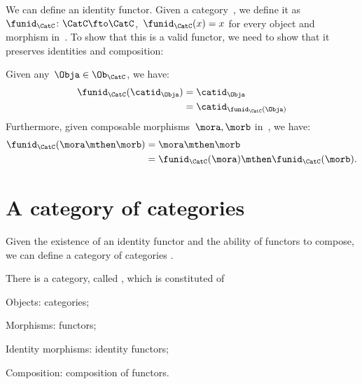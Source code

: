 We can define an identity functor. Given a category~\CatC, we define it as~$\funid_\CatC\colon \CatC \fto \CatC$,~$\funid_\CatC(x)=x$ for every object and morphism in~\CatC. To show that this is a valid functor, we need to show that it preserves identities and composition:
\begin{compactitem}
  \item Given any~$\Obja \in \Ob_\CatC$, we have:
  \begin{equation*}
    \begin{aligned}
      \funid_{\CatC}(\catid_\Obja)&=\catid_\Obja\\
      &=\catid_{\funid_{\CatC}(\Obja)}
    \end{aligned}
  \end{equation*}
  Furthermore, given composable morphisms~$\mora,\morb$ in~\CatC, we have:
  \begin{equation*}
    \begin{aligned}
      \funid_{\CatC}(\mora\mthen\morb)&=\mora\mthen\morb\\
      &=\funid_{\CatC}(\mora)\mthen \funid_{\CatC} (\morb).
    \end{aligned}
  \end{equation*}
\end{compactitem}


\section{A category of categories}

Given the existence of an identity functor and the ability of functors to compose, we can define a category of categories \Category.

\begin{ctdefinition}
  \label{def:Category}
  There is a category, called \Category, which is constituted of
  \begin{compactitem}
    \item Objects: categories;
    \item Morphisms: functors;
    \item Identity morphisms: identity functors;
    \item Composition: composition of functors.
  \end{compactitem}
\end{ctdefinition}
